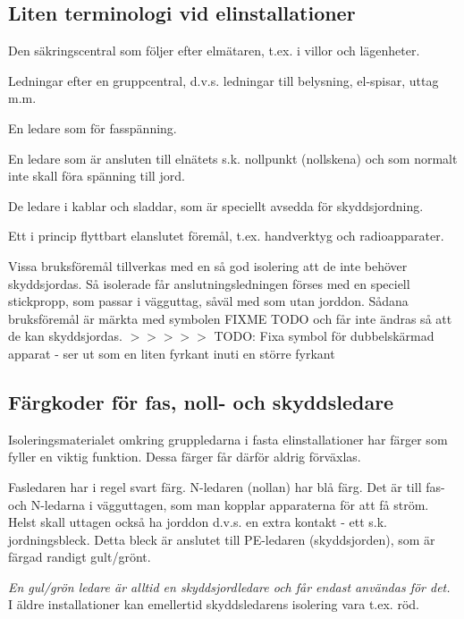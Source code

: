 \subsection{Liten terminologi vid elinstallationer}
\begin{description}[style=nextline]
\item[Gruppcentral] Den säkringscentral som följer efter elmätaren,
  t.ex. i villor och lägenheter.
\item [Gruppledningar] Ledningar efter en gruppcentral, d.v.s.
  ledningar till belysning, el-spisar, uttag m.m.
\item[Fasledare] En ledare som för fasspänning.
\item[Nolledare (N-ledare)] En ledare som är ansluten till elnätets
  s.k.  nollpunkt (nollskena) och som normalt inte skall föra spänning
  till jord.
\item[Skyddsledare (PE-Iedare)] De ledare i kablar och sladdar, som är
  speciellt avsedda för skyddsjordning.
\item[Bruksföremål] Ett i princip flyttbart elanslutet föremål,
  t.ex. handverktyg och radioapparater.
\item[Förstärkt isolering] Vissa bruksföremål tillverkas med en så god
  isolering att de inte behöver skyddsjordas. Så isolerade får
  anslutningsledningen förses med en speciell stickpropp, som passar i
  vägguttag, såväl med som utan jorddon. Sådana bruksföremål är märkta
  med symbolen FIXME TODO och får inte ändras så att de kan skyddsjordas.
  $>>>>>$ TODO: Fixa symbol för dubbelskärmad apparat - ser ut som en liten fyrkant inuti en större fyrkant
\end{description}

\subsection{Färgkoder för fas, noll- och skyddsledare}

Isoleringsmaterialet omkring gruppledarna i fasta elinstallationer har
färger som fyller en viktig funktion. Dessa färger får därför aldrig
förväxlas.

Fasledaren har i regel svart färg. N-ledaren (nollan) har blå färg.
Det är till fas- och N-ledarna i vägguttagen, som man kopplar
apparaterna för att få ström. Helst skall uttagen också ha jorddon
d.v.s. en extra kontakt - ett s.k. jordningsbleck. Detta bleck är
anslutet till PE-ledaren (skyddsjorden), som är färgad randigt
gult/grönt.

\emph{En gul/grön ledare är alltid en skyddsjordledare och får endast
  användas för det.} I äldre installationer kan emellertid
skyddsledarens isolering vara t.ex. röd.


